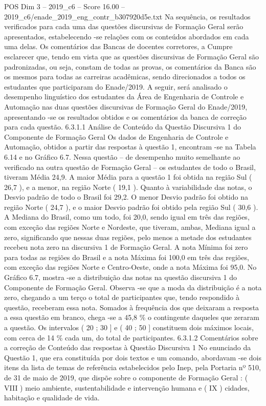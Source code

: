 \begin{textsample}{POS Dim 3 – 2019\_c6 – Score 16.00 – 2019\_c6/enade\_2019\_eng\_contr\_b307920d5e.txt}
Na sequência, os resultados verificados para cada uma das questões discursivas de Formação Geral serão apresentados, estabelecendo -se relações com os conteúdos abordados em cada uma delas.
Os comentários das Bancas de docentes corretores, a Cumpre esclarecer que, tendo em vista que as questões discursivas de Formação Geral são padronizadas, ou seja, constam de todas as provas, os comentários da Banca são os mesmos para todas as carreiras acadêmicas, sendo direcionados a todos os estudantes que participaram do Enade/2019.
A seguir, será analisado o desempenho linguístico dos estudantes da Área de Engenharia de Controle e Automação nas duas questões discursivas de Formação Geral do Enade/2019, apresentando -se os resultados obtidos e os comentários da banca de correção para cada questão. 6.3.1.1 Análise de Conteúdo da Questão Discursiva 1 do Componente de Formação Geral Os dados de Engenharia de Controle e Automação, obtidos a partir das respostas à questão 1, encontram -se na Tabela 6.14 e no Gráfico 6.7.
Nessa questão – de desempenho muito semelhante ao verificado na outra questão de Formação Geral – os estudantes de todo o Brasil, tiveram Média 24,9.
A maior Média para a questão 1 foi obtida na região Sul ( 26,7 ), e a menor, na região Norte ( 19,1 ).
Quanto à variabilidade das notas, o Desvio padrão de todo o Brasil foi 29,2.
O menor Desvio padrão foi obtido na região Norte ( 24,7 ), e o maior Desvio padrão foi obtido pela região Sul ( 30,6 ).
A Mediana do Brasil, como um todo, foi 20,0, sendo igual em três das regiões, com exceção das regiões Norte e Nordeste, que tiveram, ambas, Mediana igual a zero, significando que nessas duas regiões, pelo menos a metade dos estudantes recebeu nota zero na discursiva 1 de Formação Geral.
A nota Mínima foi zero para todas as regiões do Brasil e a nota Máxima foi 100,0 em três das regiões, com exceção das regiões Norte e Centro-Oeste, onde a nota Máxima foi 95,0.
No Gráfico 6.7, mostra -se a distribuição das notas na questão discursiva 1 do Componente de Formação Geral.
Observa -se que a moda da distribuição é a nota zero, chegando a um terço o total de participantes que, tendo respondido à questão, receberam essa nota.
Somados à frequência dos que deixaram a resposta a essa questão em branco, chega -se a 45,8 \% o contingente daqueles que zeraram a questão.
Os intervalos ( 20 ; 30 ] e ( 40 ; 50 ] constituem dois máximos locais, com cerca de 14 \% cada um, do total de participantes. 6.3.1.2 Comentários sobre a correção de Conteúdo das respostas à Questão Discursiva 1 No enunciado da Questão 1, que era constituída por dois textos e um comando, abordavam -se dois itens da lista de temas de referência estabelecidos pelo Inep, pela Portaria nº 510, de 31 de maio de 2019, que dispõe sobre o componente de Formação Geral : ( VIII ) meio ambiente, sustentabilidade e intervenção humana e ( IX ) cidades, habitação e qualidade de vida.

\end{textsample}
